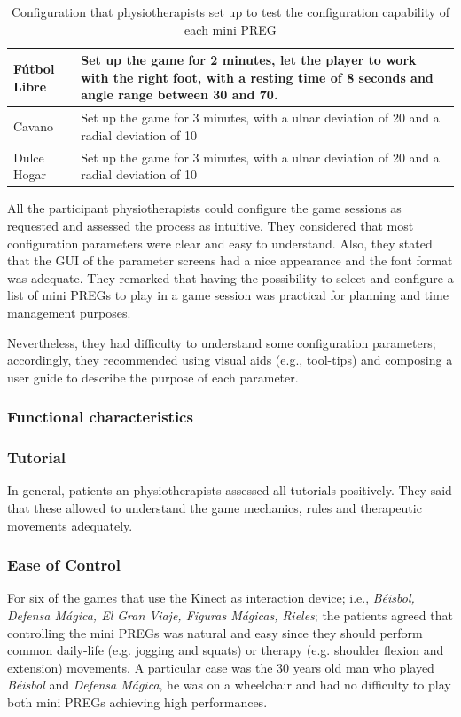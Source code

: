 \begin{table}[tbh]
{\begin{tabular}{lp{16cm}}
\\\midrule
F\'utbol Libre
& Set up the game for 2 minutes, let the player to work with the right foot, with a resting time of 8 seconds and angle range between 30 and 70.
\\\midrule
Cavano
& Set up the game for 3 minutes, with a ulnar deviation of 20 and a radial deviation of 10
\\\midrule
Dulce Hogar
& Set up the game for 3 minutes, with a ulnar deviation of 20 and a radial deviation of 10
\\\midrule
\bottomrule
\end{tabular}}
\caption{Configuration that physiotherapists set up to test the configuration capability of each mini \ac{PREG}}
\label{tab:configurations}
\end{table}

All the participant physiotherapists could configure the game sessions as requested and assessed the process as intuitive. They considered that most configuration parameters were clear and easy to understand. Also, they stated that the \ac{GUI} of the parameter screens had a nice appearance and the font format was adequate. They remarked that having the possibility to select and configure a list of mini \acp{PREG} to play in a game session was practical for planning and time management purposes.

Nevertheless, they had difficulty to understand some configuration parameters; accordingly, they recommended using visual aids (e.g., tool-tips) and composing a user guide to describe the purpose of each parameter.

\subsubsection{Functional characteristics}
\subsubsection*{Tutorial}
In general, patients an physiotherapists assessed all tutorials positively. They said that these allowed to understand the game mechanics, rules and therapeutic movements adequately.

\subsubsection*{Ease of Control}
For six of the games that use the Kinect as interaction device; i.e., \textit{B\'eisbol, Defensa M\'agica, El Gran Viaje, Figuras Mágicas, Rieles}; the patients agreed that controlling the mini \acp{PREG} was natural and easy since they should perform common daily-life (e.g. jogging and squats) or therapy (e.g. shoulder flexion and extension) movements. A particular case was the 30 years old man who played \textit{B\'eisbol} and \textit{Defensa M\'agica}, he was on a wheelchair and had no difficulty to play both mini \acp{PREG} achieving high performances.

